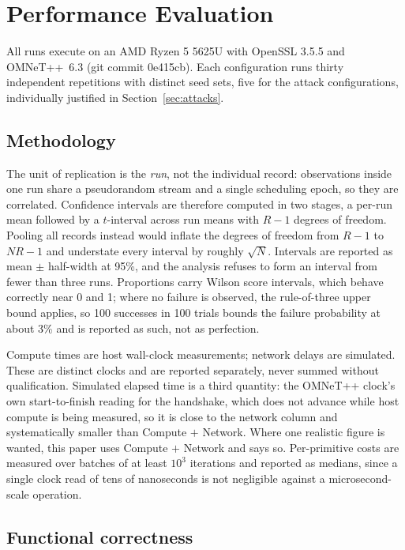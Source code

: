 \documentclass[journal]{IEEEtran}
\begin{document}
\section{Performance Evaluation}
\label{sec:eval}

All runs execute on an AMD Ryzen 5 5625U with OpenSSL 3.5.5 and
OMNeT++~6.3 (git commit 0e415cb). Each configuration runs thirty independent
repetitions with distinct seed sets, five for the attack configurations,
individually justified in Section~\ref{sec:attacks}.

\subsection{Methodology}
\label{sec:method}

The unit of replication is the \emph{run}, not the individual record:
observations inside one run share a pseudorandom stream and a single scheduling
epoch, so they are correlated. Confidence intervals are therefore computed in
two stages, a per-run mean followed by a $t$-interval across run means with
$R-1$ degrees of freedom. Pooling all records instead would inflate the degrees
of freedom from $R-1$ to $NR-1$ and understate every interval by roughly
$\sqrt{N}$. Intervals are reported as mean $\pm$ half-width at 95\%, and the
analysis refuses to form an interval from fewer than three runs. Proportions
carry Wilson score intervals, which behave correctly near 0 and 1; where no
failure is observed, the rule-of-three upper bound applies, so 100 successes in
100 trials bounds the failure probability at about 3\% and is reported as such,
not as perfection.

Compute times are host wall-clock measurements; network delays are simulated.
These are distinct clocks and are reported separately, never summed without
qualification. Simulated elapsed time is a third quantity: the OMNeT++ clock's
own start-to-finish reading for the handshake, which does not advance while
host compute is being measured, so it is close to the network column and
systematically smaller than Compute $+$ Network. Where one realistic figure is
wanted, this paper uses Compute $+$ Network and says so. Per-primitive costs
are measured over batches of at least $10^3$ iterations and reported as
medians, since a single clock read of tens of nanoseconds is not negligible
against a microsecond-scale operation.

\subsection{Functional correctness}
\label{sec:eval-fun}
\end{document}
